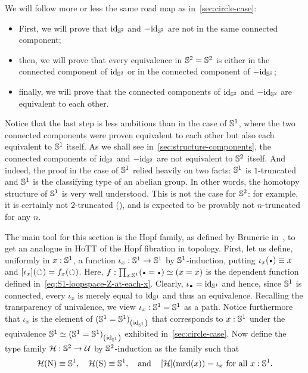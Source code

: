 \documentclass[english,a4paper]{lmcs}
\begin{document}
We will follow more or less the same road map as
in~\cref{sec:circle-case}:
\begin{itemize}
\item First, we will prove that $\mathord{\mathrm{id}}_{{\mathbb S^{2}}}$ and $-\mathord{\mathrm{id}}_{{\mathbb S^{2}}}$ are not in
  the same connected component;
\item then, we will prove that every equivalence in ${{\mathbb S^{2}}}={{\mathbb S^{2}}}$ is
  either in the connected component of $\mathord{\mathrm{id}}_{{\mathbb S^{2}}}$ or in the connected
  component of $-\mathord{\mathrm{id}}_{{\mathbb S^{2}}}$;
\item finally, we will prove that the connected components of $\mathord{\mathrm{id}}_{{\mathbb S^{2}}}$
  and $-\mathord{\mathrm{id}}_{{\mathbb S^{2}}}$ are equivalent to each other.
\end{itemize}
Notice that the last step is less ambitious than in the case of ${{\mathbb S^{1}}}$,
where the two connected components were proven equivalent to each
other but also each equivalent to ${{\mathbb S^{1}}}$ itself.
As we shall see in~\cref{sec:structure-components}, the connected
components of $\mathord{\mathrm{id}}_{{\mathbb S^{2}}}$ and $-\mathord{\mathrm{id}}_{{\mathbb S^{2}}}$ are not equivalent to ${{\mathbb S^{2}}}$
itself.
And indeed, the proof in the case of ${{\mathbb S^{1}}}$ relied heavily on two
facts: ${{\mathbb S^{1}}}$ is $1$-truncated and ${{\mathbb S^{1}}}$ is the classifying type of an
abelian group. In other words, the homotopy structure of ${{\mathbb S^{1}}}$ is very
well understood. This is not the case for ${{\mathbb S^{2}}}$: for example, it is
certainly not $2$-truncated (\cite{brunerie:thesis}), and is expected
to be provably not $n$-truncated for any $n$.

The main tool for this section is the Hopf family, as defined by Brunerie
in~\cite{brunerie:thesis}, to get an analogue in HoTT of the Hopf
fibration in topology. First, let us define, uniformly in $x:{{\mathbb S^{1}}}$, a
function $\iota_x: {{\mathbb S^{1}}}\to{{\mathbb S^{1}}}$ by ${{\mathbb S^{1}}}$-induction, putting
$\iota_x(\base) \jdeq x$ and $\mathop{\left[{\iota_x}\right]}(\mathord{\circlearrowleft}) = f_x(\mathord{\circlearrowleft})$.
Here, $f\from \prod_{x\from\Sc} (\base=\base) \weq (x=x)$ is the
dependent function defined in~\cref{eq:S1-loopspace-Z-at-each-x}.
Clearly, $\iota_{\base}=\id_{\Sc}$ and hence, since ${{\mathbb S^{1}}}$ is connected,
every $\iota_x$ is merely equal to $\mathord{\mathrm{id}}_{{{\mathbb S^{1}}}}$ and thus an equivalence.
Recalling the transparency of univalence,
we view $\iota_x: {{\mathbb S^{1}}}={{\mathbb S^{1}}}$ as a path.
Notice furthermore that $\iota_x$ is the element
of ${({{\mathbb S^{1}}}={{\mathbb S^{1}}})}_{\left(\mathord{\mathrm{id}}_{{\mathbb S^{1}}}\right)}$ that corresponds to $x:{{\mathbb S^{1}}}$
under the equivalence ${{\mathbb S^{1}}} \simeq {({{\mathbb S^{1}}}={{\mathbb S^{1}}})}_{\left(\mathord{\mathrm{id}}_{{\mathbb S^{1}}}\right)}$
exhibited in~\cref{sec:circle-case}. Now define the type family
${\mathcal H}: {{\mathbb S^{2}}} \to \mathcal{U}$ by ${{\mathbb S^{2}}}$-induction as the family such that
\begin{displaymath}
  {\mathcal H}(\mathrm{N}) \equiv {{\mathbb S^{1}}},\quad
  {\mathcal H}(\mathrm{S}) \equiv {{\mathbb S^{1}}},\quad\text{and}\quad
  \mathop{\left[{{\mathcal H}}\right]} (\operatorname{\mathrm{mrd}}(x)) = \iota_x\ \text{for all}\ x:{{\mathbb S^{1}}}.
\end{displaymath}
\end{document}
